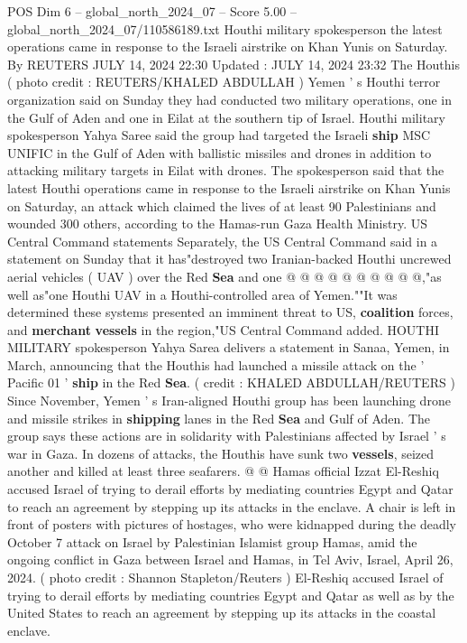\begin{textsample}{POS Dim 6 – global\_north\_2024\_07 – Score 5.00 – global\_north\_2024\_07/110586189.txt}  \label{ex:f6_pos_240}
Houthi military spokesperson the latest operations came in response to the Israeli airstrike on Khan Yunis on Saturday.
By REUTERS JULY 14, 2024 22:30 Updated : JULY 14, 2024 23:32 The Houthis ( photo credit : REUTERS/KHALED ABDULLAH ) Yemen ' s Houthi terror organization said on Sunday they had conducted two military operations, one in the Gulf of Aden and one in Eilat at the southern tip of Israel.
Houthi military spokesperson Yahya Saree said the group had targeted the Israeli \textbf{ship} MSC UNIFIC in the Gulf of Aden with ballistic missiles and drones in addition to attacking military targets in Eilat with drones.
The spokesperson said that the latest Houthi operations came in response to the Israeli airstrike on Khan Yunis on Saturday, an attack which claimed the lives of at least 90 Palestinians and wounded 300 others, according to the Hamas-run Gaza Health Ministry.
US Central Command statements Separately, the US Central Command said in a statement on Sunday that it has"destroyed two Iranian-backed Houthi uncrewed aerial vehicles ( UAV ) over the Red \textbf{Sea} and one @ @ @ @ @ @ @ @ @ @,"as well as"one Houthi UAV in a Houthi-controlled area of Yemen.""It was determined these systems presented an imminent threat to US, \textbf{coalition} forces, and \textbf{merchant} \textbf{vessels} in the region,"US Central Command added.
HOUTHI MILITARY spokesperson Yahya Sarea delivers a statement in Sanaa, Yemen, in March, announcing that the Houthis had launched a missile attack on the ' Pacific 01 ' \textbf{ship} in the Red \textbf{Sea}. ( credit : KHALED ABDULLAH/REUTERS ) Since November, Yemen ' s Iran-aligned Houthi group has been launching drone and missile strikes in \textbf{shipping} lanes in the Red \textbf{Sea} and Gulf of Aden.
The group says these actions are in solidarity with Palestinians affected by Israel ' s war in Gaza.
In dozens of attacks, the Houthis have sunk two \textbf{vessels}, seized another and killed at least three seafarers. @ @ Hamas official Izzat El-Reshiq accused Israel of trying to derail efforts by mediating countries Egypt and Qatar to reach an agreement by stepping up its attacks in the enclave.
A chair is left in front of posters with pictures of hostages, who were kidnapped during the deadly October 7 attack on Israel by Palestinian Islamist group Hamas, amid the ongoing conflict in Gaza between Israel and Hamas, in Tel Aviv, Israel, April 26, 2024. ( photo credit : Shannon Stapleton/Reuters ) El-Reshiq accused Israel of trying to derail efforts by mediating countries Egypt and Qatar as well as by the United States to reach an agreement by stepping up its attacks in the coastal enclave.

\end{textsample}
